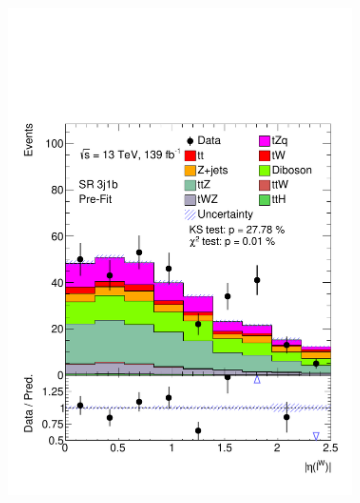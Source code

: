 \begin{figure}[!h]
\begin{subfigure}[b]{0.33\linewidth}
    \includegraphics[width=\linewidth]{ubonn-thesis/Chapters/Chapters_06/Figure/Input_distribution/SR_3j1b_lepW_eta.pdf} 
  \end{subfigure}%
  \begin{subfigure}[b]{0.33\linewidth}
    \centering

\end{subfigure}
\end{figure}
